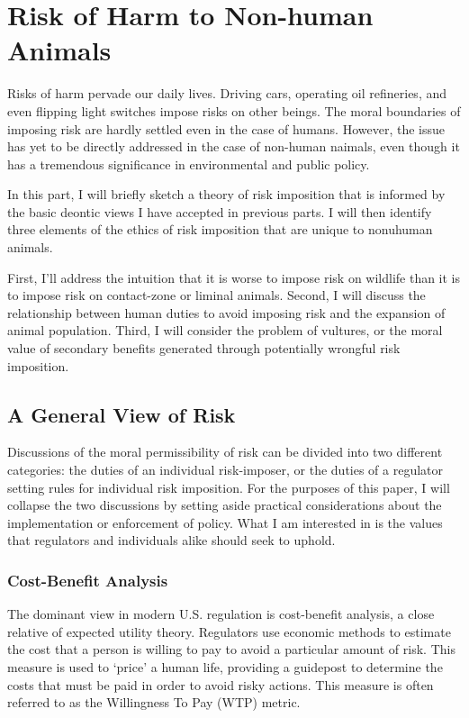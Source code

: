 \chapter{Risk of Harm to Non-human Animals}

Risks of harm pervade our daily lives. Driving cars, operating oil refineries,
and even flipping light switches impose risks on other beings.  The moral
boundaries of imposing risk are hardly settled even in the case of humans.
However, the issue has yet to be directly addressed in the case of non-human
naimals, even though it has a tremendous significance in environmental and
public policy.

In this part, I will briefly sketch a theory of risk imposition that is
informed by the basic deontic views I have accepted in previous parts.  I
will then identify three elements of the ethics of risk imposition that are
unique to nonuhuman animals.

First, I’ll address the intuition that it is worse to impose risk on wildlife
than it is to impose risk on contact-zone or liminal animals.  Second, I will
discuss the relationship between human duties to avoid imposing risk and the
expansion of animal population.  Third, I will consider the problem of
vultures, or the moral value of secondary benefits generated through
potentially wrongful risk imposition.

\section{A General View of Risk}

Discussions of the moral permissibility of risk can be divided into two
different categories: the duties of an individual risk-imposer, or the duties
of a regulator setting rules for individual risk imposition. For the purposes
of this paper, I will collapse the two discussions by setting aside practical
considerations about the implementation or enforcement of policy. What I am
interested in is the values that regulators and individuals alike should seek
to uphold.

\subsection{Cost-Benefit Analysis}

The dominant view in modern U.S. regulation is cost-benefit analysis, a close
relative of expected utility theory. Regulators use economic methods to
estimate the cost that a person is willing to pay to avoid a particular amount
of risk.  This measure is used to ‘price’ a human life, providing a guidepost
to determine the costs that must be paid in order to avoid risky actions. This
measure is often referred to as the Willingness To Pay (WTP) metric.

